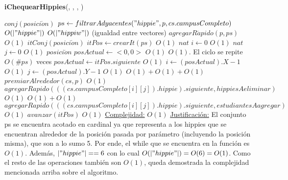 \begin{Algoritmos}
\begin{algorithm}[H]{\textbf{iChequearHippies}(, , , )}
  \begin{algorithmic}
        \State $conj(posici\acute{o}n)$ $ps \gets filtrarAdyacentes("hippie",p,cs.campusCompleto)$	\Comment $O(|"hippie"|)$
        	\Comment $O(|"hippiw"|)$ (igualdad entre vectores)
	        \State $agregarR\acute{a}pido(p,ps)$	\Comment $O(1)$
        \EndIf
        \State $itConj(posici\acute{o}n)$ $itPos \gets crearIt(ps)$	\Comment $O(1)$
        \State $nat$ $i \gets 0$	\Comment $O(1)$
        \State $nat$ $j \gets 0$	\Comment $O(1)$
        \State $posici\acute{o}n$ $posActual \gets <0,0>$	\Comment $O(1)$
        	\Comment  $O(1)$. El ciclo se repite $O(\#ps)$ veces
        	\State $posActual \gets itPos.siguiente$	\Comment $O(1)$
			\State $i \gets (posActual).X-1$	\Comment $O(1)$
            \State $j \gets (posActual).Y-1$	\Comment $O(1)$
            	\Comment $O(1) + O(1) + O(1) $
            	\State $premiarAlrededor(cs,p)$	\Comment $O(1)$
            	\State $agregarRapido(((cs.campusCompleto[i][j]).hippie).siguiente,hippiesAeliminar)$	\Comment $O(1)$
            \EndIf
            	\Comment $O(1) + O(1)$
            	\State $agregarRapido(((cs.campusCompleto[i][j]).hippie).siguiente,estudiantesAagregar)$	\Comment $O(1)$
            \EndIf
            \State $avanzar(itPos)$	\Comment $O(1)$
        \EndWhile
        \medskip
	\Statex \underline{Complejidad:} $O(1)$
    \Statex \underline{Justificaci\'on:} El conjunto ps se encuentra acotado en cardinal ya que representa a los hippies que se encuentran alrededor de la posici\'on pasada por par\'ametro (incluyendo la posici\'on misma), que son a lo sumo 5. Por ende, el while que se encuentra en la funci\'on es $O(1)$. Adem\'as, $|"hippie"| == 6$ con lo cual $O(|"hippie"|) = O(6) = O(1)$. Como el resto de las operaciones tambi\'en son $O(1)$, queda demostrada la complejidad mencionada arriba sobre el algoritmo.
  \end{algorithmic}
\end{algorithm}



\end{Algoritmos}
